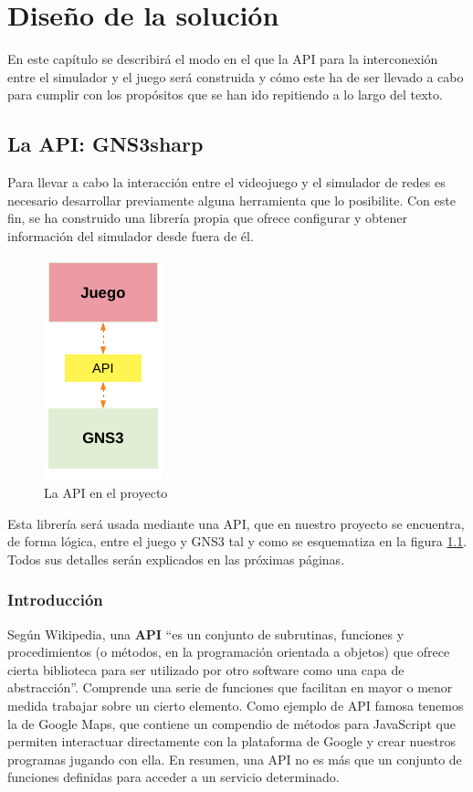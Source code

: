 \chapter{Diseño de la solución}\label{chap:Design}
En este capítulo se describirá el modo en el que la API para la interconexión entre el simulador y el juego será construida y cómo este ha de ser llevado a cabo para cumplir con los propósitos que se han ido repitiendo a lo largo del texto.

\section{La API: GNS3sharp}\label{sec:dis_api}
Para llevar a cabo la interacción entre el videojuego y el simulador de redes es necesario desarrollar previamente alguna herramienta que lo posibilite. Con este fin, se ha construido una librería propia que ofrece configurar y obtener información del simulador desde fuera de él.

\begin{figure}[H]
  \centering
  \includegraphics[scale=1.4]{imagenes/capa_api}
  \caption{La API en el proyecto}
  \label{fig:capa_api}
\end{figure}

Esta librería será usada mediante una API, que en nuestro proyecto se encuentra, de forma lógica, entre el juego y GNS3 tal y como se esquematiza en la figura \ref{fig:capa_api}. Todos sus detalles serán explicados en las próximas páginas.

\subsection{Introducción}\label{subsec:sectionapi}
Según Wikipedia, una \textbf{API} ``es un conjunto de subrutinas, funciones y procedimientos (o métodos, en la programación orientada a objetos) que ofrece cierta biblioteca para ser utilizado por otro software como una capa de abstracción''\cite{wiki:api}. Comprende una serie de funciones que facilitan en mayor o menor medida trabajar sobre un cierto elemento. Como ejemplo de API famosa tenemos la de Google Maps, que contiene un compendio de métodos para JavaScript que permiten interactuar directamente con la plataforma de Google y crear nuestros programas jugando con ella\cite{googlemaps}. En resumen, una API no es más que un conjunto de funciones definidas para acceder a un servicio determinado.

